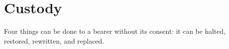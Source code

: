 \chapter{Custody}
\label{sec:13}
Four things can be done to a bearer without its consent: it can be halted, restored, rewritten, and replaced.
